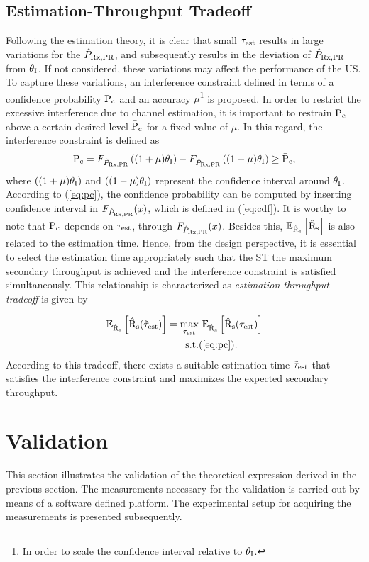 \subsection{Estimation-Throughput Tradeoff}
Following the estimation theory, it is clear that small $\tau_{\text{est}}$ results in large variations for the $\hat{P}_{\text{Rx,PR}}$, and subsequently results in the deviation of $\hat{P}_{\text{Rx,PR}}$ from $\theta_{\text{I}}$. If not considered, these variations may affect the performance of the US. To capture these variations, an interference constraint defined in terms of a confidence probability $\text{P}_{\text{c}}$ and an accuracy $\mu$\footnote{In order to scale the confidence interval relative to $\theta_{\text{I}}$.} is proposed. In order to restrict the excessive interference due to channel estimation, it is important to restrain $\text{P}_{\text{c}}$ above a certain desired level $\bar{\text{P}}_{\text{c}}$ for a fixed value of $\mu$. In this regard, the interference constraint is defined as
\begin{align}
\text{P}_{\text{c}} = F_{\hat{P}_{\text{Rx,PR}}} \left( {(1 + \mu) \theta_{\text{I}}}\right)  - F_{\hat{P}_{\text{Rx,PR}}} \left({(1 - \mu) \theta_{\text{I}}} \right) \ge \bar{\text{P}}_{\text{c}}, \label{eq:pc} 
\end{align}
where $\left( {(1 + \mu) \theta_{\text{I}}}\right)$ and $\left({(1 - \mu) \theta_{\text{I}}} \right)$ represent the confidence interval around $\theta_{\text{I}}$. According to (\ref{eq:pc}), the confidence probability can be computed by inserting confidence interval in $F_{\hat{P}_{\text{Rx,PR}}}(x)$, which is defined in (\ref{eq:cdf}). It is worthy to note that $\text{P}_{\text{c}}$ depends on $\tau_{\text{est}}$, through $F_{\hat{P}_{\text{Rx,PR}}}(x)$. Besides this, ${\mathbb E}_{\hat{\text{{R}}}_{\text{s}}}\left[ \hat{\text{{R}}}_{\text{s}} \right]$ is also related to the estimation time. Hence, from the design perspective, it is essential to select the estimation time appropriately such that the ST the maximum secondary throughput is achieved and the interference constraint is satisfied simultaneously. This relationship is characterized as \textit{estimation-throughput tradeoff} is given by 

\begin{align}
{\mathbb E}_{\hat{\text{{R}}}_{\text{s}}}\left[ \hat{\text{{R}}}_{\text{s}}(\tilde{\tau}_{\text{est}}) \right] = \operatorname*{max}_{\tau_{\text{est}}}  & \text{      } {\mathbb E}_{\hat{\text{{R}}}_{\text{s}}}\left[ \hat{\text{{R}}}_{\text{s}}(\tau_{\text{est}}) \right] 
 \label{eq:sys} \\
\text{s.t.} & (\ref{eq:pc}). \nonumber  
\end{align}
According to this tradeoff, there exists a suitable estimation time $\tilde{\tau}_{\text{est}}$ that satisfies the interference constraint and maximizes the expected secondary throughput. 

\section{Validation}
\label{sec:val}
This section illustrates the validation of the theoretical expression derived in the previous section. The measurements necessary for the validation is carried out by means of a software defined platform. The experimental setup for acquiring the measurements is presented subsequently. 
 
